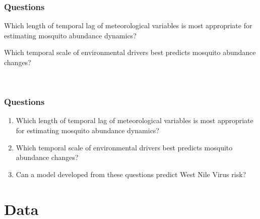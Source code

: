 \documentclass{beamer}
\begin{document}
\begin{frame}
\frametitle{Questions}

\begin{enumerate}\Large
\item Which length of temporal lag of meteorological variables is most appropriate for estimating mosquito abundance dynamics? \vspace{.3cm}

	\item Which temporal scale of environmental drivers best predicts mosquito abundance changes? \vspace{.3cm}
	\textcolor{white}{
	\item Can a model developed from these questions predict West Nile Virus risk?}
\vspace{1cm}

\end{enumerate}

\end{frame}

\begin{frame}
\frametitle{Questions}

\begin{enumerate}\Large
	\item Which length of temporal lag of meteorological variables is most appropriate for estimating mosquito abundance dynamics? \vspace{.3cm}
	
	\item Which temporal scale of environmental drivers best predicts mosquito abundance changes? \vspace{.3cm}
	
	\item Can a model developed from these questions predict West Nile Virus risk?
	\vspace{1cm}
	
\end{enumerate}

\end{frame}

\section{Data}
\end{document}
